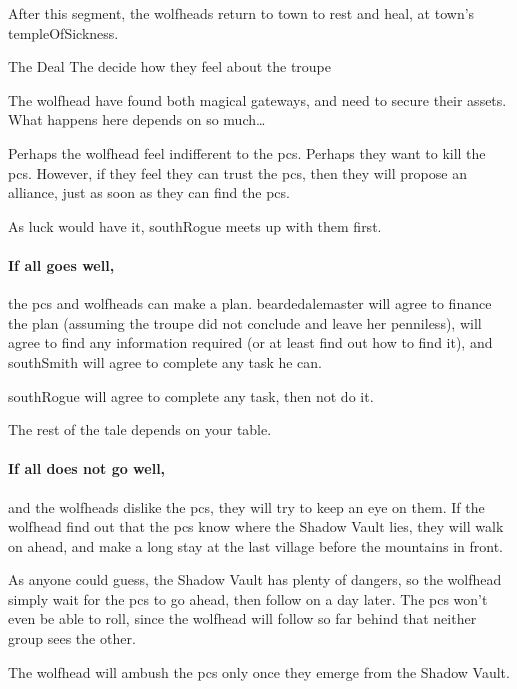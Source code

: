 \setcounter{wounds}{3}
\beardedalemaster


After this \gls{segment}, the \glspl{wolfhead} return to \gls{town} to rest and heal, at \gls{town}'s \gls{templeOfSickness}.

{The Deal}%
{The  decide how they feel about the troupe}%

The \gls{wolfhead} have found both magical gateways, and need to secure their assets.
What happens here depends on so much\ldots

Perhaps the \gls{wolfhead} feel indifferent to the \glspl{pc}.
Perhaps they want to kill the \glspl{pc}.
However, if they feel they can trust the \glspl{pc}, then they will propose an alliance, just as soon as they can find the \glspl{pc}.

As luck would have it, \gls{southRogue} meets up with them first.

\paragraph{If all goes well,}
the \glspl{pc} and \glspl{wolfhead} can make a plan.
\Gls{beardedalemaster} will agree to finance the plan (assuming the troupe did not conclude  and leave her penniless),  will agree to find any information required (or at least find out how to find it), and \gls{southSmith} will agree to complete any task he can.

\Gls{southRogue} will agree to complete any task, then not do it.

The rest of the tale depends on your table.

\paragraph{If all does not go well,}
and the \glspl{wolfhead} dislike the \glspl{pc}, they will try to keep an eye on them.
If the \gls{wolfhead} find out that the \glspl{pc} know where the Shadow Vault lies, they will walk on ahead, and make a long stay at the last \gls{village} before the mountains in front.

As anyone could guess, the Shadow Vault has plenty of dangers, so the \gls{wolfhead} simply wait for the \glspl{pc} to go ahead, then follow on a day later.
The \glspl{pc} won't even be able to roll, since the \gls{wolfhead} will follow so far behind that neither group sees the other.

The \gls{wolfhead} will ambush the \glspl{pc} only once they emerge from the Shadow Vault.
